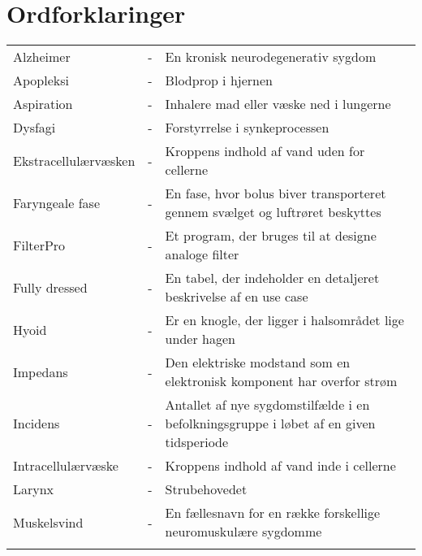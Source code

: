 \chapter{Ordforklaringer}

\begin{table}[H]
\center
{}
\begin{tabularx}{\linewidth}{l l X}	

Alzheimer & - & En kronisk neurodegenerativ sygdom  \\ \addlinespace[2mm]
Apopleksi & - &    Blodprop i hjernen \\ \addlinespace[2mm]
Aspiration & - &   Inhalere mad eller væske ned i lungerne \\ \addlinespace[2mm]

Dysfagi			& - & Forstyrrelse i synkeprocessen  \\ \addlinespace[2mm]

Ekstracellulærvæsken & - &   Kroppens indhold af vand uden for cellerne\\ \addlinespace[2mm]

Faryngeale fase	& - & En fase, hvor bolus biver transporteret gennem svælget og luftrøret beskyttes   \\ \addlinespace[2mm]
FilterPro  		& - & Et program, der bruges til at designe analoge filter  \\ \addlinespace[2mm]
Fully dressed & - &   En tabel, der indeholder en detaljeret beskrivelse af en use case\\ \addlinespace[2mm]

Hyoid& - &  Er en knogle, der ligger i halsområdet lige under hagen \\ \addlinespace[2mm]

Impedans & - &  Den elektriske modstand som en elektronisk komponent har overfor strøm \\ \addlinespace[2mm]
Incidens 			& - &  Antallet af nye sygdomstilfælde i en befolkningsgruppe i løbet af en given tidsperiode \\ \addlinespace[2mm]
Intracellulærvæske 			& - &   Kroppens indhold af vand inde i cellerne\\ \addlinespace[2mm]

Larynx& - & Strubehovedet   \\ \addlinespace[2mm]

Muskelsvind& - &   En fællesnavn for en række forskellige neuromuskulære sygdomme\\ \addlinespace[2mm]


\end{tabularx}
\end{table}

